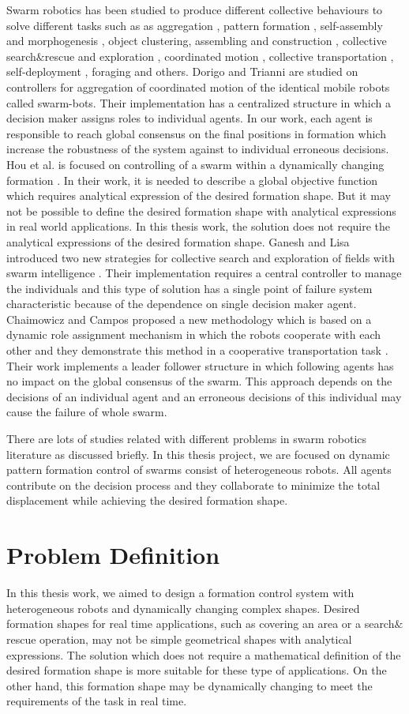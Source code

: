 Swarm robotics has been studied to produce different collective behaviours to solve different tasks such as as aggregation , pattern formation , self-assembly and morphogenesis , object clustering, assembling and construction , collective search$\&$rescue and exploration , coordinated motion , collective transportation , self-deployment , foraging and others\cite{5}. Dorigo and Trianni \cite{7} are studied on controllers for aggregation of coordinated motion of the identical mobile robots called swarm-bots. Their implementation has a centralized structure in which a decision maker assigns roles to individual agents. In our work, each agent is responsible to reach global consensus on the final positions in formation which increase the robustness of the system against to individual erroneous decisions. Hou et al. is focused on controlling of a swarm within a dynamically changing formation \cite{8}. In their work, it is needed to describe a global objective function which requires analytical expression of the desired formation shape. But it may not be possible to define the desired formation shape with analytical expressions in real world applications. In this thesis work, the solution does not require the analytical expressions of the desired formation shape.  Ganesh and Lisa introduced two new strategies for collective search and exploration of fields with swarm intelligence \cite{9}. Their implementation requires a central controller to manage the individuals and this type of solution has a single point of failure system characteristic because of the dependence on single decision maker agent.   Chaimowicz and Campos proposed a new methodology which is based on a dynamic role assignment mechanism in which the robots cooperate with each other and they demonstrate this method in a cooperative transportation task \cite{10}. Their work implements a leader follower structure in which following agents has no impact on the global consensus of the swarm. This approach depends on the decisions of an individual agent and an erroneous decisions of this individual may cause the failure of whole swarm. 

There are lots of studies related with different problems in swarm robotics literature as discussed briefly. In this thesis project, we are focused on dynamic pattern formation control of swarms consist of heterogeneous robots. All agents contribute on the decision process and they collaborate to minimize the total displacement while achieving the desired formation shape. 

\section{Problem Definition}
In this thesis work, we aimed to design a formation control system with heterogeneous robots and dynamically changing complex shapes. Desired formation shapes for real time applications, such as covering an area or a search$\&$rescue operation, may not be simple geometrical shapes with analytical expressions. The solution which does not require a mathematical definition of the desired formation shape is more suitable for these type of applications. On the other hand, this formation shape may be dynamically changing to meet the requirements of the task in real time. 

